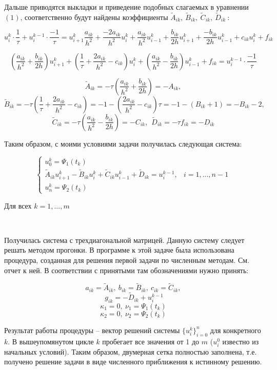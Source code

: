 \documentclass[12pt,a4paper]{article}
\begin{document}
Дальше приводятся выкладки и приведение подобных слагаемых в уравнении $(1)$, соответственно будут найдены коэффициенты $\tilde A_{ik},\ \tilde B_{ik},\ \tilde C_{ik},\ \tilde D_{ik}\ $:

$$
 u_i^k \cdot \frac{1}{\tau} + u_i^{k-1} \cdot \frac{-1}{\tau} =
 u_{i+1}^k \frac{a_{ik}}{h^2} + \frac{-2a_{ik}}{h^2} u_i^k + 
 \frac{a_{ik}}{h^2} u_{i-1}^k + \frac{b_{ik}}{2h} u_{i+1}^k +
 \frac{-b_{ik}}{2h} u_{i-1}^k + c_{ik} u_i^k + f_{ik}
$$

$$
 \left ( 
  \frac{a_{ik}}{h^2} + \frac{b_{ik}}{2h}
 \right )
 u_{i+1}^k
 +
 \left (
  \frac{1}{\tau} + \frac{2a_{ik}}{h^2} - c_{ik}
 \right )
 u_i^k
 +
 \left (
  \frac{a_{ik}}{h^2} - \frac{b_{ik}}{2h}
 \right )
 u_{i-1}^k
 + f_{ik}
 = u_i^{k-1} \cdot \frac{-1}{\tau}
$$

$$
 \tilde A_{ik} = -\tau \left (  \frac{a_{ik}}{h^2} + \frac{b_{ik}}{2h} \right )
 = - A_{ik},
$$
$$
 \tilde B_{ik} = -\tau  
 \left ( 
  \frac{1}{\tau} + \frac{2a_{ik}}{h^2} - c_{ik} 
 \right ) 
 = -1 - \left ( \frac{2a_{ik}}{h^2} - c_{ik} \right ) \tau
 = -1 - (B_{ik} + 1) = -B_{ik} - 2,
$$
$$
 \tilde C_{ik} = -\tau \left (  \frac{a_{ik}}{h^2} - \frac{b_{ik}}{2h} \right )
 = -C_{ik}, \ \ 
 \tilde  D_{ik} = -\tau f_{ik} = -D_{ik}
$$

Таким образом, с моими условиями задачи получилась следующая система:

$$
 \begin{cases}
  u_0^k = \Psi_1(t_k) 
  \\
  \tilde A_{ik} u_{i+1}^k - \tilde B_{ik} u_i^k + \tilde C_{ik} u_{i-1}^k +
  \tilde D_{ik} = u_i^{k-1}, & i=1,...,n-1 
  \\ 
  u_n^k = \Psi_2(t_k)
 \end{cases}
$$

Для всех $k=1,...,m$

\

Получилась система с трехдиагональной матрицей. Данную систему следует решать методом прогонки. В программе к этой задаче была использована процедура, созданная для решения первой задачи по численным методам. См. отчет к ней. В соответствии с принятыми там обозначениями нужно принять:

$$ a_{ik} = \tilde A_{ik}, \ b_{ik} = \tilde B_{ik}, \ c_{ik} = \tilde C_{ik}, $$
$$  \ g_{ik} = -\tilde D_{ik} + u_i^{k-1} $$
$$ \kappa_1 = 0, \ \nu_1 = \Psi_1(t_k) $$
$$ \kappa_2 = 0, \ \nu_2 = \Psi_2(t_k) $$

Результат работы процедуры -- вектор решений системы $\{ u_i^k \}_{i=0}^n$ для конкретного $k$. В вышеупомянутом цикле $k$ пробегает все значения от 1 до $m$ ($u_i^0$ известно из начальных условий). Таким образом, двумерная сетка полностью заполнена, т.е. получено решение задачи в виде численного приближения к истинному решению. 
\end{document}

